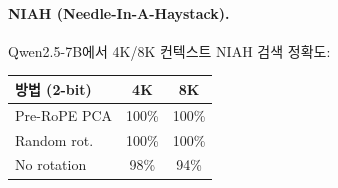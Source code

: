 \paragraph{NIAH (Needle-In-A-Haystack).}
Qwen2.5-7B에서 4K/8K 컨텍스트 NIAH 검색 정확도:

\begin{center}
\begin{tabular}{@{}lcc@{}}
\toprule
방법 (2-bit) & 4K & 8K \\
\midrule
Pre-RoPE PCA & 100\% & 100\% \\
Random rot. & 100\% & 100\% \\
No rotation & 98\% & 94\% \\
\bottomrule
\end{tabular}
\end{center}
